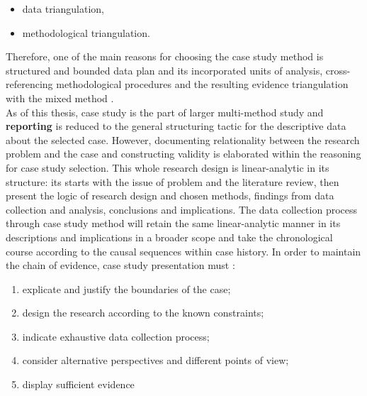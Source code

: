 \documentclass[11pt]{report}
\begin{document}
\begin{itemize}
\item data triangulation,
\item methodological triangulation. 
\end{itemize}

Therefore, one of the main reasons for choosing the case study method is structured and bounded data plan and its incorporated units of analysis, cross-referencing methodological procedures and the resulting evidence triangulation with the mixed method .
\\
As of this thesis, case study is the part of larger multi-method study and \textbf{reporting} is reduced to the general structuring tactic for 
the descriptive data about the selected case. However, documenting relationality between the research problem and the case and constructing validity is elaborated within the reasoning for case study selection. This whole research design is linear-analytic in its structure: its starts with the issue of problem and the literature review, then present the logic of research design and  chosen methods, findings from data collection and analysis, conclusions and implications. The data collection process through case study method will retain the same linear-analytic manner in its descriptions and implications in a broader scope and take the chronological course according to the causal sequences within case history. In order to maintain the chain of evidence, case study presentation must :
\begin{enumerate}
\item explicate and justify the boundaries of the case;
\item design the research according to the known constraints;
\item indicate exhaustive data collection process;
\item consider alternative perspectives and different points of view;
\item display sufficient evidence
\end{enumerate}
\end{document}
